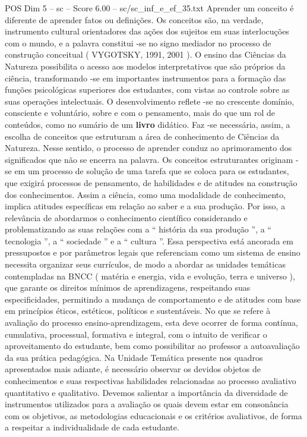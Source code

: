 \begin{textsample}{POS Dim 5 – sc – Score 6.00 – sc/sc\_inf\_e\_ef\_35.txt}
Aprender um conceito é diferente de aprender fatos ou definições.
Os conceitos são, na verdade, instrumento cultural orientadores das ações dos sujeitos em suas interlocuções com o mundo, e a palavra constitui -se no signo mediador no processo de construção conceitual ( VYGOTSKY, 1991, 2001 ).
O ensino das Ciências da Natureza possibilita o acesso aos modelos interpretativos que são próprios da ciência, transformando -se em importantes instrumentos para a formação das funções psicológicas superiores dos estudantes, com vistas ao controle sobre as suas operações intelectuais.
O desenvolvimento reflete -se no crescente domínio, consciente e voluntário, sobre e com o pensamento, mais do que um rol de conteúdos, como no sumário de um \textbf{livro} didático.
Faz -se necessária, assim, a escolha de conceitos que estruturam a área de conhecimento de Ciências da Natureza.
Nesse sentido, o processo de aprender conduz ao aprimoramento dos significados que não se encerra na palavra.
Os conceitos estruturantes originam -se em um processo de solução de uma tarefa que se coloca para os estudantes, que exigirá processos de pensamento, de habilidades e de atitudes na construção dos conhecimentos.
Assim a ciência, como uma modalidade de conhecimento, implica atitudes específicas em relação ao saber e a sua produção.
Por isso, a relevância de abordarmos o conhecimento científico considerando e problematizando as suas relações com a “ história da sua produção ”, a “ tecnologia ”, a “ sociedade ” e a “ cultura ”.
Essa perspectiva está ancorada em pressupostos e por parâmetros legais que referenciam como um sistema de ensino necessita organizar seus currículos, de modo a abordar as unidades temáticas contempladas na BNCC ( matéria e energia, vida e evolução, terra e universo ), que garante os direitos mínimos de aprendizagens, respeitando suas especificidades, permitindo a mudança de comportamento e de atitudes com base em princípios éticos, estéticos, políticos e sustentáveis.
No que se refere à avaliação do processo ensino-aprendizagem, esta deve ocorrer de forma contínua, cumulativa, processual, formativa e integral, com o intuito de verificar o aproveitamento do estudante, bem como possibilitar ao professor a autoavaliação da sua prática pedagógica.
Na Unidade Temática presente nos quadros apresentados mais adiante, é necessário observar os devidos objetos de conhecimentos e suas respectivas habilidades relacionadas ao processo avaliativo quantitativo e qualitativo.
Devemos salientar a importância da diversidade de instrumentos utilizados para a avaliação os quais devem estar em consonância com os objetivos, as metodologias educacionais e os critérios avaliativos, de forma a respeitar a individualidade de cada estudante.

\end{textsample}
